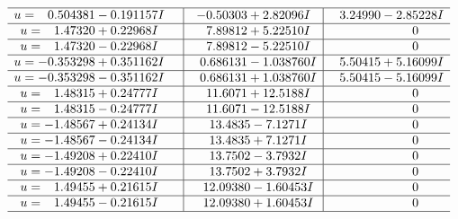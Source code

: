 \documentclass[1p]{elsarticle_modified}
\theoremstyle{definition}
\begin{document}
$$\begin{array}{c|c|c}
 \hline 
\begin{aligned}
u &= \phantom{-}0.504381 - 0.191157 I\end{aligned}
 & -0.50303 + 2.82096 I & \phantom{-}3.24990 - 2.85228 I \\ \hline\begin{aligned}
u &= \phantom{-}1.47320 + 0.22968 I\end{aligned}
 & \phantom{-}7.89812 + 5.22510 I & \phantom{-0.000000 } 0 \\ \hline\begin{aligned}
u &= \phantom{-}1.47320 - 0.22968 I\end{aligned}
 & \phantom{-}7.89812 - 5.22510 I & \phantom{-0.000000 } 0 \\ \hline\begin{aligned}
u &= -0.353298 + 0.351162 I\end{aligned}
 & \phantom{-}0.686131 - 1.038760 I & \phantom{-}5.50415 + 5.16099 I \\ \hline\begin{aligned}
u &= -0.353298 - 0.351162 I\end{aligned}
 & \phantom{-}0.686131 + 1.038760 I & \phantom{-}5.50415 - 5.16099 I \\ \hline\begin{aligned}
u &= \phantom{-}1.48315 + 0.24777 I\end{aligned}
 & \phantom{-}11.6071 + 12.5188 I & \phantom{-0.000000 } 0 \\ \hline\begin{aligned}
u &= \phantom{-}1.48315 - 0.24777 I\end{aligned}
 & \phantom{-}11.6071 - 12.5188 I & \phantom{-0.000000 } 0 \\ \hline\begin{aligned}
u &= -1.48567 + 0.24134 I\end{aligned}
 & \phantom{-}13.4835 - 7.1271 I & \phantom{-0.000000 } 0 \\ \hline\begin{aligned}
u &= -1.48567 - 0.24134 I\end{aligned}
 & \phantom{-}13.4835 + 7.1271 I & \phantom{-0.000000 } 0 \\ \hline\begin{aligned}
u &= -1.49208 + 0.22410 I\end{aligned}
 & \phantom{-}13.7502 - 3.7932 I & \phantom{-0.000000 } 0 \\ \hline\begin{aligned}
u &= -1.49208 - 0.22410 I\end{aligned}
 & \phantom{-}13.7502 + 3.7932 I & \phantom{-0.000000 } 0 \\ \hline\begin{aligned}
u &= \phantom{-}1.49455 + 0.21615 I\end{aligned}
 & \phantom{-}12.09380 - 1.60453 I & \phantom{-0.000000 } 0 \\ \hline\begin{aligned}
u &= \phantom{-}1.49455 - 0.21615 I\end{aligned}
 & \phantom{-}12.09380 + 1.60453 I & \phantom{-0.000000 } 0\\
 \hline 
 \end{array}$$\newpage
\end{document}

